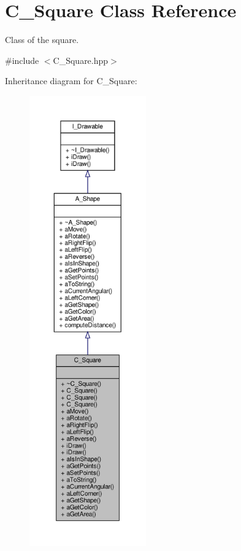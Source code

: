 \hypertarget{classC__Square}{}\section{C\+\_\+\+Square Class Reference}
\label{classC__Square}


Class of the square.  




{\ttfamily \#include $<$C\+\_\+\+Square.\+hpp$>$}



Inheritance diagram for C\+\_\+\+Square\+:
\nopagebreak
\begin{figure}[H]
\begin{center}
\leavevmode
\includegraphics[height=550pt]{classC__Square__inherit__graph}
\end{center}
\end{figure}



